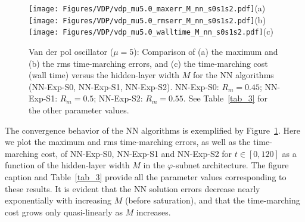 \begin{figure}
  \centerline{
    \texttt{[image: Figures/VDP/vdp\_mu5.0\_maxerr\_M\_nn\_s0s1s2.pdf]}(a)
    \texttt{[image: Figures/VDP/vdp\_mu5.0\_rmserr\_M\_nn\_s0s1s2.pdf]}(b)
    \texttt{[image: Figures/VDP/vdp\_mu5.0\_walltime\_M\_nn\_s0s1s2.pdf]}(c)
  }
  \caption{Van der pol oscillator ($\mu=5$):
    Comparison of (a) the maximum and (b) the rms time-marching errors, and (c) the
    time-marching cost (wall time) versus the hidden-layer width $M$
    for the NN algorithms (NN-Exp-S0, NN-Exp-S1, NN-Exp-S2).
    NN-Exp-S0: $R_m=0.45$;
    NN-Exp-S1: $R_m=0.5$; NN-Exp-S2: $R_m=0.55$.
    See Table~\ref{tab_3} for the other parameter values.
  }
  \label{fg_17}
\end{figure}


The convergence behavior of the NN algorithms is exemplified by Figure~\ref{fg_17}.
Here we plot the maximum and rms time-marching errors, as well as the time-marching cost,
of NN-Exp-S0, NN-Exp-S1 and NN-Exp-S2 for $t\in[0,120]$ as a function of
the hidden-layer width $M$ in the $\varphi$-subnet architecture.
The figure caption and Table~\ref{tab_3} provide all the parameter values
corresponding to these results.
It is evident that the  NN solution errors decrease nearly exponentially
with increasing $M$ (before saturation), and that
the time-marching cost grows only quasi-linearly
as $M$ increases.




